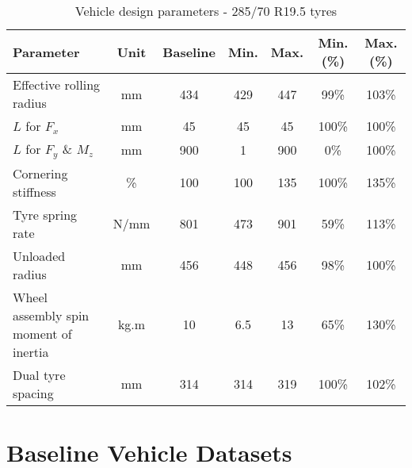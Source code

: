 \begin{table}[H]
	\centering\footnotesize
	\begin{threeparttable}

		\begin{tabulary}{\textwidth}{lcccccc}
			\toprule
			\textbf{Parameter} & \textbf{Unit} & \textbf{Baseline} & \textbf{Min.} & \textbf{Max.} & \textbf{Min. (\%)} & \textbf{Max. (\%)} \\

			\midrule
			Effective rolling radius & mm    & 434   & 429   & 447   & 99\%  & 103\% \\
			$L$ for $F_x$ & mm     & 45    & 45    & 45    & 100\% & 100\% \\
			$L$ for $F_y$ \& $M_z$ & mm     & 900   & 1     & 900   & 0\%   & 100\% \\
			Cornering stiffness & \%    & 100   & 100   & 135   & 100\% & 135\% \\
			Tyre spring rate & N/mm  & 801   & 473   & 901   & 59\%  & 113\% \\
			Unloaded radius & mm    & 456   & 448   & 456   & 98\%  & 100\% \\
			Wheel assembly spin moment of inertia & kg.m\sstw{} & 10    & 6.5   & 13    & 65\%  & 130\% \\
			Dual tyre spacing & mm    & 314   & 314   & 319   & 100\% & 102\% \\

			\bottomrule
		\end{tabulary}

		\caption{Vehicle design parameters - 285/70 R19.5 tyres}
		\label{table:vdp-tyre-285}


	\end{threeparttable}
\end{table}

\section{Baseline Vehicle \trucksim{} Datasets}\label{section:baseline-trucksim-datasets}


